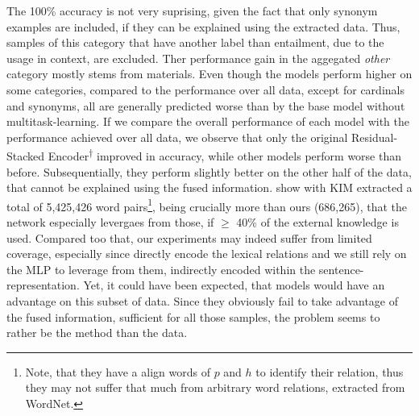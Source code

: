 The 100\% accuracy is not very suprising, given the fact that only synonym examples are included, if they can be explained using the extracted data. Thus, samples of this category that have another label than entailment, due to the usage in context, are excluded. Ther performance gain in the aggegated \textit{other} category mostly stems from materials. Even though the models perform higher on some categories, compared to the performance over all data, except for cardinals and synonyms, all are generally predicted worse than by the base model without multitask-learning. If we compare the overall performance of each model with the performance achieved over all data, we observe that only the original Residual-Stacked Encoder\textsuperscript{$\dagger$} improved in accuracy, while other models perform worse than before. Subsequentially, they perform slightly better on the other half of the data, that cannot be explained using the fused information. \cite{chen2017natural} show with \ac{KIM} extracted a total of 5,425,426 word pairs\footnote{Note, that they have a align words of $p$ and $h$ to identify their relation, thus they may not suffer that much from arbitrary word relations, extracted from WordNet.}, being crucially more than ours (686,265), that the network especially levergaes from those, if $\geq$ 40\% of the external knowledge is used. Compared too that, our experiments may indeed suffer from limited coverage, especially since \cite{chen2017natural} directly encode the lexical relations and we still rely on the \ac{MLP} to leverage from them, indirectly encoded within the sentence-representation. Yet, it could have been expected, that models would have an advantage on this subset of data. Since they obviously fail to take advantage of the fused information, sufficient for all those samples, the problem seems to rather be the method than the data.

